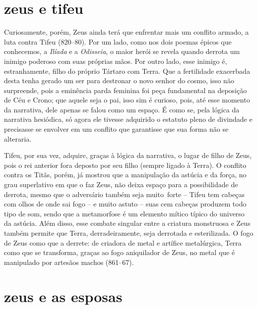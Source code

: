 \section{zeus e tifeu}

Curiosamente, porém, Zeus ainda terá que enfrentar mais um conflito armado, a
luta contra Tifeu (820--80). Por um lado, como nos dois poemas épicos que
conhecemos, a \textit{Ilíada} e a \textit{Odisseia}, o maior herói se revela
quando derrota um inimigo poderoso com suas próprias mãos. Por outro lado, esse
inimigo é, estranhamente, filho do próprio Tártaro com Terra. Que a fertilidade
exacerbada desta tenha gerado um ser para destronar o novo senhor do cosmo,
isso não surpreende, pois a eminência parda feminina foi peça fundamental na
deposição de Céu e Crono; que aquele seja o pai, isso sim é curioso, pois, até
esse momento da narrativa, dele apenas se falou como um espaço. É como se, pela
lógica da narrativa hesiódica, só agora ele tivesse adquirido o estatuto pleno
de divindade e precisasse se envolver em um conflito que garantisse que sua
forma não se alteraria.

Tifeu, por sua vez, adquire, graças à lógica da narrativa, o lugar de filho de
Zeus, pois o rei anterior fora deposto por seu filho (sempre ligado à Terra). O
conflito contra os Titãs, porém, já mostrou que a manipulação da astúcia e da
força, no grau superlativo em que o faz Zeus, não deixa espaço para a
possibilidade de derrota, mesmo que o adversário também seja \mbox{muito forte} –
Tifeu tem cabeças com olhos de onde sai fogo – e muito astuto – suas cem
cabeças produzem todo tipo de som, sendo que a metamorfose é um elemento mítico
típico do universo da astúcia. Além disso, esse combate singular entre a
criatura monstruosa e Zeus também permite que Terra, derradeiramente, seja
derrotada e esterilizada. O fogo de Zeus como que a derrete: de criadora de
metal e artífice metalúrgica, Terra como que se transforma, graças ao fogo
aniquilador de Zeus, no metal que é manipulado por artesãos machos (861--67).

\section{zeus e as esposas}

